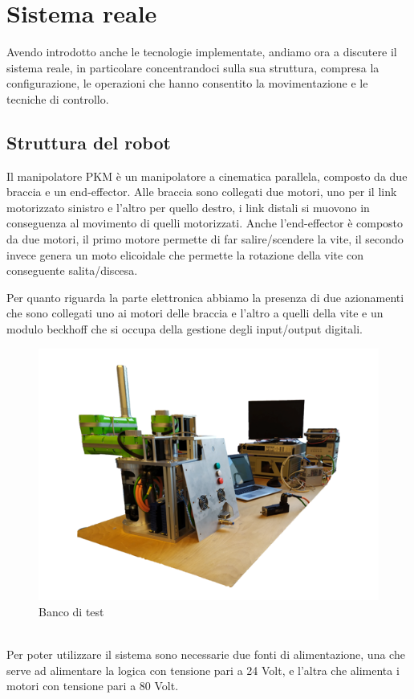 \section{Sistema reale}
Avendo introdotto anche le tecnologie implementate, andiamo ora a discutere il sistema reale, in particolare concentrandoci sulla sua struttura, compresa la configurazione, le operazioni che hanno consentito la movimentazione e le tecniche di controllo.
\subsection{Struttura del robot}
Il manipolatore PKM è un manipolatore a cinematica parallela, composto da due braccia e un end-effector. Alle braccia sono collegati due motori, uno per il link motorizzato sinistro e l'altro per quello destro, i link distali si muovono in conseguenza al movimento di quelli motorizzati. Anche l'end-effector è composto da due motori, il primo motore permette di far salire/scendere la vite, il secondo invece genera un moto elicoidale che permette la rotazione della vite con conseguente salita/discesa. 
\par Per quanto riguarda la parte elettronica abbiamo la presenza di due azionamenti che sono collegati uno ai motori delle braccia e l'altro a quelli della vite e un modulo beckhoff che si occupa della gestione degli input/output digitali.
\begin{figure}[ht]
	\begin{center}
		\includegraphics[scale=0.6]{Immagini/Sperimentale/banco}
		\caption{Banco di test}
		\label{fig:BancoProva}
	\end{center}
\end{figure}
\\Per poter utilizzare il sistema sono necessarie due fonti di alimentazione, una che serve ad alimentare la logica con tensione pari a 24 Volt, e l'altra che alimenta i motori con tensione pari a  80 Volt.
